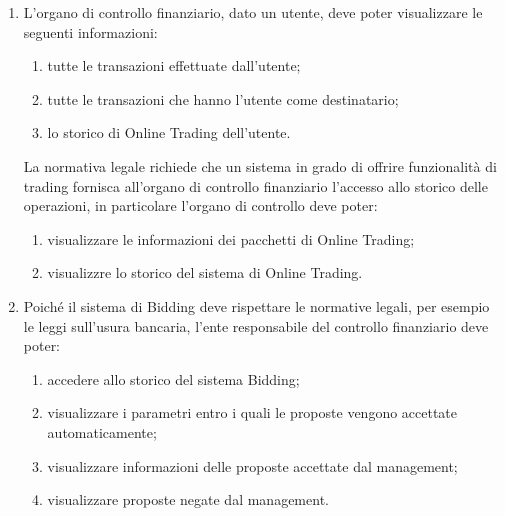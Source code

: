 \begin{enumerate}
	\item \label{itm:utente:dominio:controllo-finanziario} L'organo di controllo finanziario, dato un utente, deve poter visualizzare le seguenti informazioni:
        	\begin{enumerate}
	            \item tutte le transazioni effettuate dall'utente;
    	        \item tutte le transazioni che hanno l'utente come destinatario;
	            \item lo storico di Online Trading dell'utente.
    	    \end{enumerate}
	La normativa legale richiede che un sistema in grado di offrire funzionalit\`a di trading fornisca all'organo di controllo finanziario l'accesso allo storico delle operazioni, in particolare l'organo di controllo deve poter:
	\begin{enumerate}
    	\item visualizzare le informazioni dei pacchetti di Online Trading;
    	\item visualizzre lo storico del sistema di Online Trading.
	\end{enumerate}

	\item \label{itm:utente:dominio:controllo-finanziario:bidding} Poich\'e il sistema di Bidding deve rispettare le normative legali, per esempio le leggi sull'usura bancaria, l'ente responsabile del controllo finanziario deve poter:
	\begin{enumerate}
    	\item accedere allo storico del sistema Bidding;
    	\item visualizzare i parametri entro i quali le proposte vengono accettate automaticamente;
    	\item visualizzare informazioni delle proposte accettate dal management;
    	\item visualizzare proposte negate dal management.
	\end{enumerate}

\end{enumerate}

